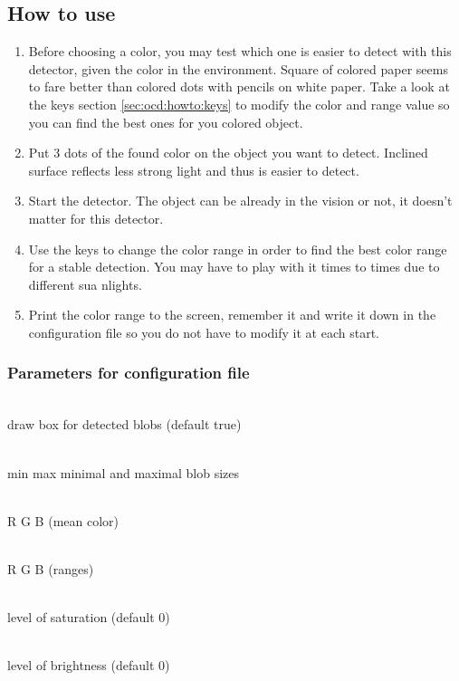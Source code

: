 \subsection{How to use}
\label{sec:ocd:howto}
    \begin{enumerate}
        \item Before choosing a color, you may test which one is easier 
        to detect with this detector, given the color in the environment. 
        Square of colored paper seems to fare better than colored 
        dots with pencils on white paper. Take a look at the keys section
        \ref{sec:ocd:howto:keys} to modify the color and range value so
        you can find the best ones for you colored object.
        \item Put 3 dots of the found color on the object you want to 
        detect. Inclined surface reflects less strong light 
            and thus is easier to detect.
        \item Start the detector. The object can be already in the vision 
        or not, it doesn’t matter for this detector. 
        \item Use the keys to change the color range in order to find the 
        best color range for a stable detection. You may have to play
        with it times to times due to different sua nlights. 
        \item Print the color range to the screen, remember it and write 
        it down in the configuration file so you do not have to modify it 
        at each start.
    \end{enumerate}

\subsubsection{Parameters for configuration file}
\label{sec:ocd:howto:params}
    \begin{description} \itemindent=-15pt
        \item[box] \hfill \\ draw box for detected blobs (default true)
        \item[area] \hfill \\ min max minimal and maximal blob sizes
        \item[color] \hfill \\ R G B (mean color)
        \item[wide] \hfill \\ R G B (ranges)
        \item[saturation] \hfill \\ level of saturation (default 0)
        \item[brightness] \hfill \\ level of brightness (default 0)
    \end{description}


